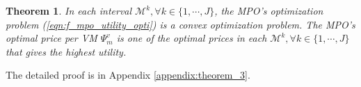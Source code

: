 \documentclass[10pt,journal, compsoc]{IEEEtran}
\newtheorem{theorem}{Theorem}
\begin{document}
\begin{theorem} \label{thm:f_mpo_convex_optimization}
In each interval $\mathcal{M}^k, \forall k \in \{1, \cdots, J\}$, the MPO's optimization problem (\ref{eqn:f_mpo_utility_opti}) is a convex optimization problem. The MPO's optimal price per VM $\Psi_m^v$ is one of the optimal prices in each $\mathcal{M}^k, \forall k \in \{1, \cdots, J\}$ that gives the highest utility.
\end{theorem}
The detailed proof is in Appendix \ref{appendix:theorem_3}.
\end{document}
